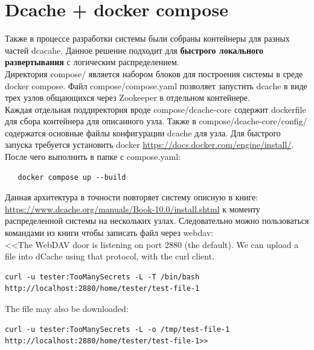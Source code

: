 \documentclass{article}
\begin{document}
\section{Dcache + docker compose}
Также в процессе разработки системы были собраны контейнеры для разных частей dcacahe. Данное решение подходит для \textbf{быстрого локального развертывания} с логическим распределением.\\
Директория compose/ является набором блоков для построения системы в среде docker compose. Файл compose/compose.yaml позволяет запустить dcache в виде трех узлов общающихся через Zookeeper в отдельном контейнере.\\
Каждая отдельная поддиректория вроде compose/dcache-core содержит dockerfile для сбора контейнера для описанного узла. Также в compose/dcache-core/config/ содержатся основные файлы конфигурации dcache для узла.
Для быстрого запуска требуется установить docker \url{https://docs.docker.com/engine/install/}. После чего выполнить в папке с compose.yaml:
\begin{verbatim}
   docker compose up --build
\end{verbatim}
Данная архитектура в точности повторяет систему описную в книге: \url{https://www.dcache.org/manuals/Book-10.0/install.shtml} к моменту распределенной системы на нескольких узлах. Следовательно можно пользоваться командами из
книги чтобы записать файл через webdav:\\
<<The WebDAV door is listening on port 2880 (the default). We can upload a file into dCache using that protocol, with the curl client.
\begin{verbatim}
curl -u tester:TooManySecrets -L -T /bin/bash 
http://localhost:2880/home/tester/test-file-1
\end{verbatim}
The file may also be downloaded:
\begin{verbatim}
curl -u tester:TooManySecrets -L -o /tmp/test-file-1 
http://localhost:2880/home/tester/test-file-1>>
\end{verbatim}
\end{document}
